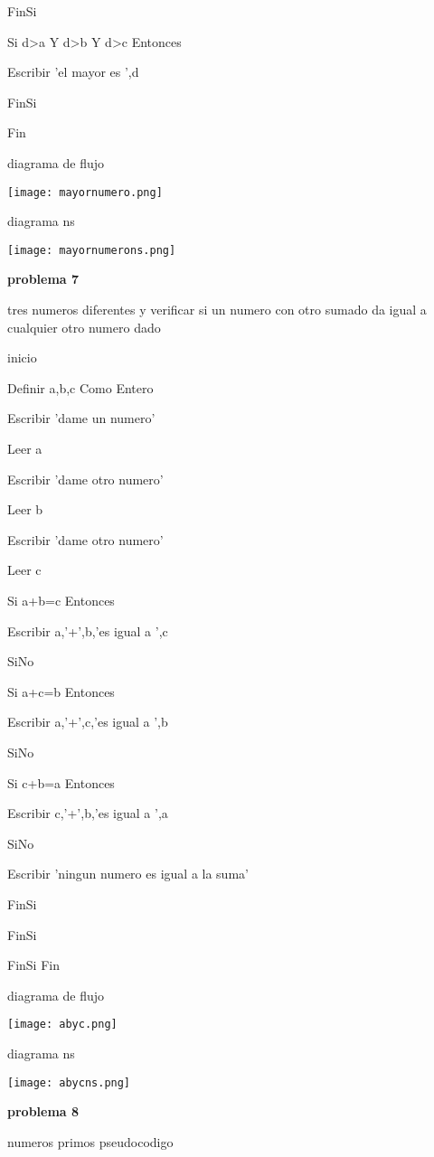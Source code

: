 \documentclass[10pt,a4paper]{article}
\begin{document}
\begin{multicols}{2}
	FinSi

	Si d>a Y d>b Y d>c Entonces

		Escribir 'el mayor es ',d
	
	FinSi

Fin

diagrama de flujo

\texttt{[image: mayornumero.png]} 	
	
diagrama ns

\texttt{[image: mayornumerons.png]}

\begin{center}
\textbf{problema 7}
\end{center} 	

tres numeros diferentes y verificar si un numero con otro sumado da igual a cualquier otro numero dado 

inicio

	Definir a,b,c Como Entero

	Escribir 'dame un numero'

	Leer a

	Escribir 'dame otro numero'

	Leer b

	Escribir 'dame otro numero'

	Leer c

	Si a+b=c Entonces

		Escribir a,'+',b,'es igual a ',c

	SiNo

		Si a+c=b Entonces

			Escribir a,'+',c,'es igual a ',b

		SiNo

			Si c+b=a Entonces

				Escribir c,'+',b,'es igual a ',a

			SiNo

				Escribir 'ningun numero es igual a la suma'

			FinSi

		FinSi
	
	FinSi
Fin

diagrama de flujo 

\texttt{[image: abyc.png]}

diagrama ns

\texttt{[image: abycns.png]}

\begin{center}
\textbf{problema 8}
\end{center}
  	numeros primos 
pseudocodigo


\end{multicols}
\end{document}
